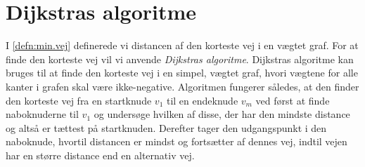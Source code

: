 \section{Dijkstras algoritme}
I \ref{defn:min.vej} definerede vi distancen af den korteste vej i en vægtet graf. For at finde den korteste vej vil vi anvende \emph{Dijkstras algoritme}. Dijkstras algoritme kan bruges til at finde den korteste vej i en simpel, vægtet graf, hvori vægtene for alle kanter i grafen skal være ikke-negative. Algoritmen fungerer således, at den finder den korteste vej fra en startknude $v_{1}$ til en endeknude $v_{m}$ ved først at finde naboknuderne til $v_{1}$ og undersøge hvilken af disse, der har den mindste distance og altså er tættest på startknuden. Derefter tager den udgangspunkt i den naboknude, hvortil distancen er mindst og fortsætter af dennes vej, indtil vejen har en større distance end en alternativ vej.

